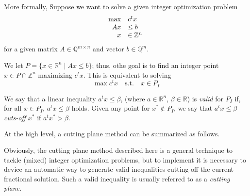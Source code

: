 \documentclass[12pt, showidx, twoside]{article}
\def\Q{\mathbb{Q}}
\def\R{\mathbb{R}}
\def\Z{\mathbb{Z}}
\begin{document}
{{More formally,\fi
Suppose we want to solve a given integer optimization problem
\begin{equation}\label{eq:IP-cut}\begin{array}{rl}
\max &c^t  x \\
Ax&\le b\\
x&\in\mathbb{Z}^n\, 
\end{array}\hfill \end{equation}
for a given matrix $A\in\Q^{m\times n}$ and vector $b\in\Q^m$.

We let $P=\{x\in\R^n\mid Ax\le b\}$; thus, othe goal is to find an integer point $x\in P\cap \Z^n$ maximizing $c^t x$. This is equivalent to solving 
\[ \max c^t x\quad\mbox{s.t.}\quad x\in P_I\]

We say that a linear inequality  $a^t  x\leq \beta$, (where $a\in\R^n$, $\beta\in \R$) is {\em valid} for $P_I$ if, for all $x\in P_I$, $a^t  x\leq \beta$ holds.
Given any point for $x^*\notin P_I$, we say that $a^t  x\leq \beta$ {\em cuts-off} $x^*$ if $a^t x^*>\beta$. 

At the high level, a cutting plane method can be summarized as follows.

\vspace{.4in}

\noindent{}
\vspace{.4in}

Obviously, the cutting plane method described here is a general technique to tackle (mixed) integer optimization problems, but to implement it is necessary to device an automatic way to generate valid inequalities cutting-off the current fractional solution. Such a valid inequality is usually referred to as a {\em cutting plane}.



}}
\end{document}
